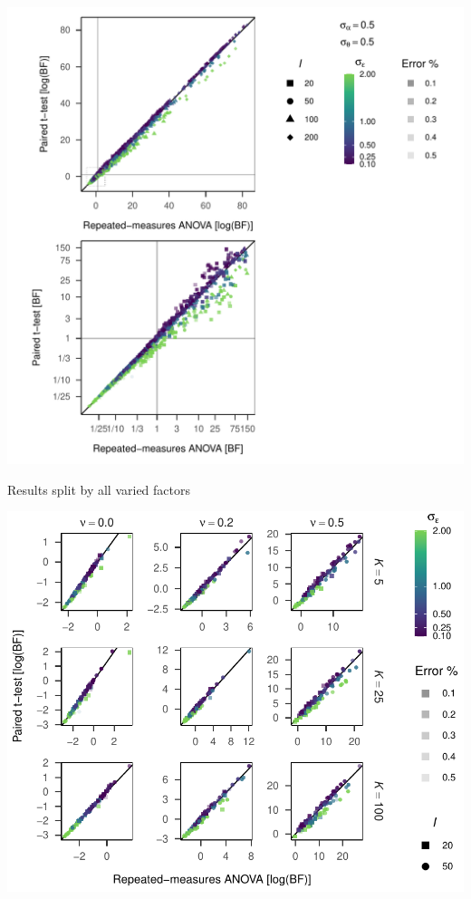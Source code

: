 \documentclass[
  a4paper,
  DIV=11,
  numbers=noendperiod,
  oneside]{scrartcl}
\begin{document}
\includegraphics{prior_translation_files/figure-pdf/simulation-results3-1.pdf}

Results split by all varied factors

\includegraphics{prior_translation_files/figure-pdf/simulation-results3-details-1.pdf}
\end{document}
